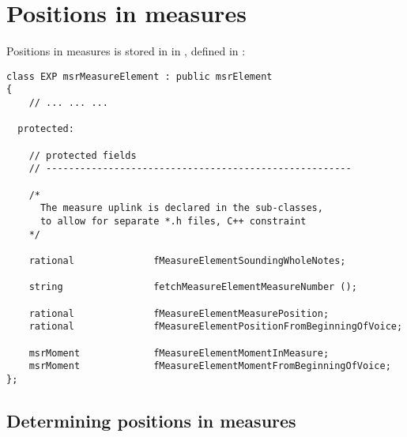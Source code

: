 

\chapter{Positions in measures}

Positions in measures is stored in  in , defined in :
\begin{lstlisting}[language=CPlusPlus]
class EXP msrMeasureElement : public msrElement
{
	// ... ... ...

  protected:

    // protected fields
    // ------------------------------------------------------

    /*
      The measure uplink is declared in the sub-classes,
      to allow for separate *.h files, C++ constraint
    */

    rational              fMeasureElementSoundingWholeNotes;

    string                fetchMeasureElementMeasureNumber ();

    rational              fMeasureElementMeasurePosition;
    rational              fMeasureElementPositionFromBeginningOfVoice;

    msrMoment             fMeasureElementMomentInMeasure;
    msrMoment             fMeasureElementMomentFromBeginningOfVoice;
};
\end{lstlisting}

\section{Determining positions in measures}

